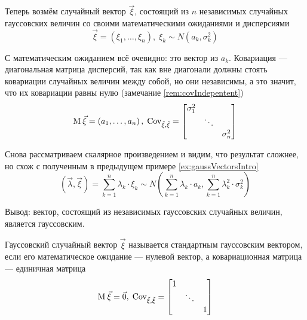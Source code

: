 \begin{example}\label{example:gaussianVector:gaussianElements}
    Теперь возмём случайный вектор $\vec{\xi}$, состоящий из $n$ независимых
    случайных гауссовских величин со своими математическими ожиданиями
    и дисперсиями
    $$\vec{\xi} = \left( \xi_1, \dots, \xi_n \right),\;
        \xi_k \sim N\left( a_k, \sigma_k^2 \right)$$

    С математическим ожиданием всё очевидно: это вектор
    из $a_k$. Ковариация --- диагональная матрица дисперсий, так как вне
    диагонали должны стоять ковариации случайных величин между собой,
    но они независимы, а это значит, что их ковариации равны нулю
    (замечание \ref{rem:covIndepentent})
    $$\operatorname{M}_{} \vec{\xi} = \left( a_1, \dots, a_n \right),\;
        \operatorname{Cov^{}_{\vec{\xi}, \vec{\xi}}} =
        \begin{bmatrix}
            \sigma_1^2 & & \\
            & \ddots & \\
            & & \sigma_n^2
        \end{bmatrix}$$

    Снова рассматриваем скалярное произведением и видим, что результат сложнее,
    но схож с полученным в предыдущем примере \ref{ex:gaussVectorsIntro}
    $$\left( \vec{\lambda}, \vec{\xi} \right)
        = \sum_{k=1}^{n} \lambda_k \cdot \xi_k \sim
        N\left( \sum_{k=1}^{n} \lambda_k \cdot a_k,
        \sum_{k=1}^{n} \lambda_k^2 \cdot \sigma_k^2 \right)$$

    Вывод: вектор, состоящий из независимых гауссовских случайных величин,
    является гауссовским.
\end{example}

\begin{definition}
    Гауссовский случайный вектор $\vec{\xi}$ называется стандартным гауссовским
    вектором, если его математическое ожидание --- нулевой вектор,
    а ковариационная матрица --- единичная матрица
    $$\operatorname{M}_{} \vec{\xi} = \vec{0},\;
        \operatorname{Cov^{}_{\vec{\xi}, \vec{\xi}}} =
        \begin{bmatrix}
            1 & & \\
            & \ddots & \\
            & & 1
        \end{bmatrix}$$
\end{definition}

